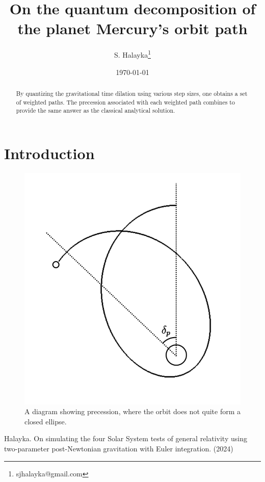 \documentclass[12pt]{article}
\title{On the quantum decomposition of the planet Mercury's orbit path}
\author{S. Halayka\footnote{sjhalayka@gmail.com}}
\date{\today\;\currenttime}
\begin{document}
 
\maketitle

\begin{abstract}
By quantizing the gravitational time dilation using various step sizes, one obtains a set of weighted paths.
The precession associated with each weighted path combines to provide the same answer as the classical analytical solution.
\end{abstract}


\section{Introduction}


\begin{figure} 
\centering
\label{fig4}
  \includegraphics[width = 6 in]{precession.png}
  \caption{ A diagram showing precession, where the orbit does not quite form a closed ellipse.
}
\end{figure}



\begin{thebibliography}{9}


 Halayka. On simulating the four Solar System tests of general relativity using two-parameter post-Newtonian gravitation with Euler integration. (2024)

\end{thebibliography}
\end{document}
